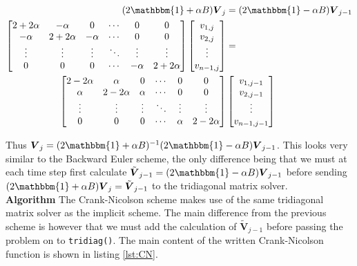 \documentclass[a4paper, 11pt, notitlepage,english]{article}
\newcommand{\id}{\mathbbm{1}}
\begin{document}
\begin{align}
(2\id + \alpha B) \boldsymbol{V}_j &= (2\id - \alpha B) \boldsymbol{V}_{j-1} \\
\begin{bmatrix}
 2+2\alpha & -\alpha & 0 & \cdots & 0 & 0 \\
 -\alpha & 2+2\alpha & -\alpha & \cdots & 0 & 0 \\
 \vdots & \vdots & \vdots & \ddots & \vdots & \vdots \\
 0 & 0 & 0 & \cdots & -\alpha & 2+2\alpha \\
\end{bmatrix}
\begin{bmatrix}
v_{1,j} \\ v_{2,j} \\ \vdots \\ v_{n-1,j}
\end{bmatrix}
&= \\
\begin{bmatrix}
 2-2\alpha & \alpha & 0 & \cdots & 0 & 0 \\
 \alpha & 2-2\alpha & \alpha & \cdots & 0 & 0 \\
 \vdots & \vdots & \vdots & \ddots & \vdots & \vdots \\
 0 & 0 & 0 & \cdots & \alpha & 2-2\alpha \\
\end{bmatrix}
&\begin{bmatrix}
v_{1,j-1} \\ v_{2,j-1} \\ \vdots \\ v_{n-1,j-1}
\end{bmatrix}
\label{eq:Crank_Nicolson_matrix}
\end{align}

Thus $\boldsymbol{V}_j = (2\id+\alpha B)^{-1}(2\id - \alpha B)\boldsymbol{V}_{j-1}$. This looks very similar to the Backward Euler scheme, the only difference being that we must 
at each time step first calculate $\tilde{\boldsymbol{V}}_{j-1} = (2\id - \alpha B)\boldsymbol{V}_{j-1}$ before sending $(2\id + \alpha B)\boldsymbol{V}_j = \tilde{\boldsymbol{V}}_{j-1}$ to the tridiagonal matrix solver. \\

\textbf{Algorithm} \newline
The Crank-Nicolson scheme makes use of the same tridiagonal matrix solver as the implicit scheme. The main difference from the previous scheme is however that we must add the calculation of $\tilde{\mathbf{V}}_{j-1}$ before passing the problem on to \texttt{tridiag()}. The main content of the written Crank-Nicolson function is shown in listing \ref{lst:CN}. 
\end{document}
